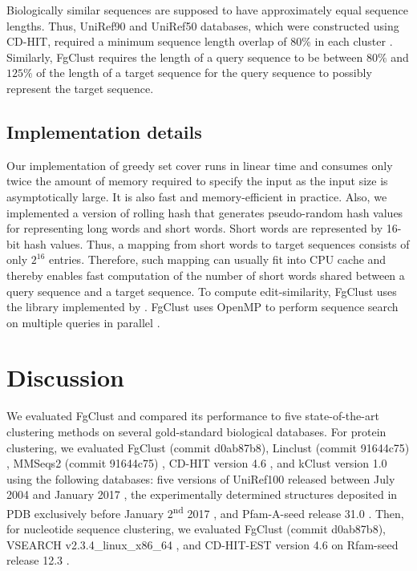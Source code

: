 \documentclass{bioinfo}
\begin{document}
Biologically similar sequences are supposed to have approximately equal sequence lengths.
Thus, UniRef90 and UniRef50 databases, which were constructed using CD-HIT, required a minimum sequence length overlap of 80\% in each cluster \citep{suzek2014uniref}.
Similarly, FgClust requires the length of a query sequence to be between \(80\%\) and \(125\%\) of the length of a target sequence for the query sequence to possibly represent the target sequence. 

\subsection{Implementation details}

Our implementation of greedy set cover runs in linear time and consumes only twice the amount of memory required to specify the input as the input size is asymptotically large. It is also fast and memory-efficient in practice. Also, we implemented a version of rolling hash that generates pseudo-random 
hash values for representing long words and short words.
Short words are represented by 16-bit hash values.
Thus, a mapping from short words to target sequences consists of only  \(2^{16}\) entries.
Therefore, such mapping can usually fit into CPU cache and thereby enables fast computation of the number of short words shared between a query sequence and a target sequence.
To compute edit-similarity, FgClust uses the library implemented by \citet{vsovsic2017edlib}.
FgClust uses OpenMP to perform sequence search on multiple queries in parallel \citep{dagum1998openmp}.


\section{Discussion}
\label{sec:discussion}

We evaluated FgClust and compared its performance to five state-of-the-art clustering methods on several gold-standard biological databases.
For protein clustering,
we evaluated FgClust (commit d0ab87b8),
Linclust (commit 91644c75) \citep{steinegger2017linclust}, 
MMSeqs2 (commit 91644c75) \citep{steinegger2017mmseqs2}, 
CD-HIT version 4.6 \citep{fu2012cd},
and kClust version 1.0 \citep{hauser2013kclust} using the following databases:
five versions of UniRef100 released between July 2004 and January 2017 \citep{suzek2014uniref},
the experimentally determined structures deposited in PDB exclusively before January 2\textsuperscript{nd} 2017 \citep{berman2006protein},
and Pfam-A-seed release 31.0 \citep{finn2016pfam}.
Then, for nucleotide sequence clustering, we evaluated FgClust
(commit d0ab87b8),
VSEARCH v2.3.4\_linux\_x86\_64 \citep{rognes2016vsearch}, and CD-HIT-EST version 4.6 \citep{fu2012cd} on Rfam-seed release 12.3 \citep{nawrocki2014rfam}.
\end{document}
